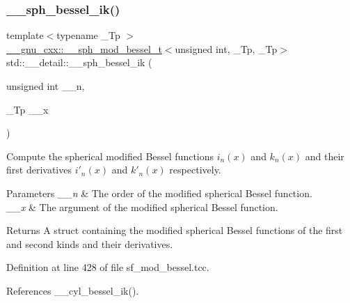 \subsubsection{\texorpdfstring{\+\_\+\+\_\+sph\+\_\+bessel\+\_\+ik()}{\_\_sph\_bessel\_ik()}}
{\footnotesize\ttfamily template$<$typename \+\_\+\+Tp $>$ \\
\hyperlink{struct____gnu__cxx_1_1____sph__mod__bessel__t}{\+\_\+\+\_\+gnu\+\_\+cxx\+::\+\_\+\+\_\+sph\+\_\+mod\+\_\+bessel\+\_\+t}$<$unsigned int, \+\_\+\+Tp, \+\_\+\+Tp$>$ std\+::\+\_\+\+\_\+detail\+::\+\_\+\+\_\+sph\+\_\+bessel\+\_\+ik (\begin{DoxyParamCaption}\item[{unsigned int}]{\+\_\+\+\_\+n,  }\item[{\+\_\+\+Tp}]{\+\_\+\+\_\+x }\end{DoxyParamCaption})}



Compute the spherical modified Bessel functions $ i_n(x) $ and $ k_n(x) $ and their first derivatives $ i'_n(x) $ and $ k'_n(x) $ respectively. 


\begin{DoxyParams}{Parameters}
{\em \+\_\+\+\_\+n} & The order of the modified spherical Bessel function. \\
\hline
{\em \+\_\+\+\_\+x} & The argument of the modified spherical Bessel function. \\
\hline
\end{DoxyParams}
\begin{DoxyReturn}{Returns}
A struct containing the modified spherical Bessel functions of the first and second kinds and their derivatives. 
\end{DoxyReturn}


Definition at line 428 of file sf\+\_\+mod\+\_\+bessel.\+tcc.



References \+\_\+\+\_\+cyl\+\_\+bessel\+\_\+ik().

\mbox{\label{namespacestd_1_1____detail_afd4f4f072924a9396676c437135c27f9}} 
